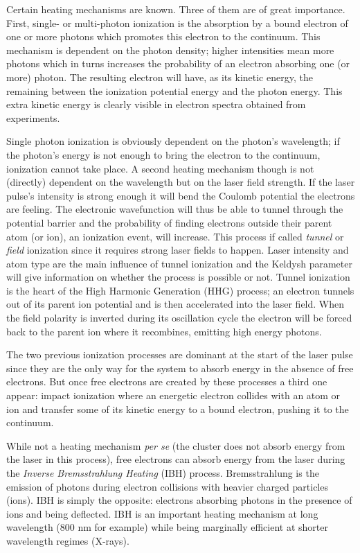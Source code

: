 Certain heating mechanisms are known. Three of them are of great importance.
First, single- or multi-photon ionization is the absorption by a bound electron
of one or more photons which promotes this electron to the continuum. This
mechanism is dependent on the photon density; higher intensities mean more
photons which in turns increases the probability of an electron absorbing one
(or more) photon. The resulting electron will have, as its kinetic energy, the
remaining between the ionization potential energy and the photon energy. This
extra kinetic energy is clearly visible in electron spectra obtained from
experiments.

Single photon ionization is obviously dependent on the photon's wavelength; if
the photon's energy is not enough to bring the electron to the continuum,
ionization cannot take place. A second heating mechanism though is not
(directly) dependent on the wavelength but on the laser field strength. If the
laser pulse's intensity is strong enough it will bend the Coulomb potential the
electrons are feeling. The electronic wavefunction will thus be able to tunnel
through the potential barrier and the probability of finding electrons
outside their parent atom (or ion), an ionization event, will increase. This
process if called \textit{tunnel} or \textit{field} ionization  since it
requires strong laser fields to happen. Laser intensity and atom type are the
main influence of tunnel ionization and the Keldysh parameter will give
information on whether the process is possible or not. Tunnel ionization is the
heart of the High Harmonic Generation (HHG) process; an electron tunnels out of
its parent ion potential and is then accelerated into the laser field. When the
field polarity is inverted during its oscillation cycle the electron will be
forced back to the parent ion where it recombines, emitting high energy photons.

The two previous ionization processes are dominant at the start of the laser
pulse since they are the only way for the system to absorb energy in the
absence of free electrons. But once free electrons are created by these
processes a third one appear: impact ionization where an energetic electron
collides with an atom or ion and transfer some of its kinetic energy to a bound
electron, pushing it to the continuum.

While not a heating mechanism \textit{per se} (the cluster does not absorb
energy from the laser in this process), free electrons can absorb energy from
the laser during the \textit{Inverse Bremsstrahlung Heating} (IBH) process.
Bremsstrahlung is the emission of photons during electron collisions with
heavier charged particles (ions). IBH is simply the opposite: electrons
absorbing photons in the presence of ions and being deflected. IBH is an
important heating mechanism at long wavelength (800 nm for example) while being
marginally efficient at shorter wavelength regimes (X-rays).

